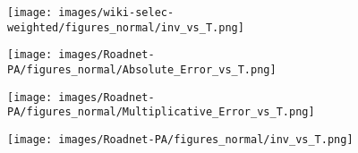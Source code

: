 \begin{figure*}[htbp]
\begin{subfigure}{\textwidth}
\begin{minipage}[b]{0.3\textwidth}
		\texttt{[image: images/wiki-selec-weighted/figures\_normal/inv\_vs\_T.png]} %
	\end{minipage}
\end{subfigure}

\begin{subfigure}[b]{\textwidth}
	\centering
	\begin{minipage}[b]{0.05\textwidth}
		\centering
	\end{minipage}%
	\begin{minipage}[b]{0.3\textwidth}
		\centering
		\texttt{[image: images/Roadnet-PA/figures\_normal/Absolute\_Error\_vs\_T.png]} %
		
	\end{minipage}%
	\begin{minipage}[b]{0.3\textwidth}
		\centering
		
		\texttt{[image: images/Roadnet-PA/figures\_normal/Multiplicative\_Error\_vs\_T.png]} %
		
	\end{minipage}%
	\begin{minipage}[b]{0.3\textwidth}
		\centering
		
		\texttt{[image: images/Roadnet-PA/figures\_normal/inv\_vs\_T.png]} %
	\end{minipage}
	
\end{subfigure}


\end{figure*}
